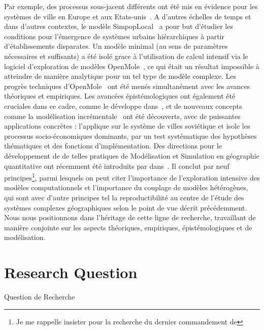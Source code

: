 { Par exemple, des processus sous-jacent différents ont été mis en évidence pour les systèmes de ville en Europe et aux Etats-unis~\cite{bretagnolle2010comparer}. A d'autres échelles de temps et dans d'autres contextes, le modèle SimpopLocal~\cite{schmitt2014modelisation} a pour but d'étudier les conditions pour l'émergence de systèmes urbains hiérarchiques à partir d'établissements disparates. Un modèle minimal (au sens de paramètres nécessaires et suffisants) a été isolé grace à l'utilisation de calcul intensif via le logiciel d'exploration de modèles OpenMole~\cite{schmitt2014half}, ce qui était un résultat impossible à atteindre de manière analytique pour un tel type de modèle complexe. Les progrès techniques d'OpenMole~\cite{reuillon2013openmole} ont été menés simultanément avec les avances théoriques et empiriques. Les avancées épistémologiques ont également été cruciales dans ce cadre, comme  le développe dans~\cite{rey2015plateforme}, et de nouveaux concepts comme la modélisation incrémentale~\cite{cottineau2015incremental} ont été découverts, avec de puissantes applications concrètes : \cite{cottineau2014evolution} l'applique sur le système de villes soviétique et isole les processus socio-économiques dominants, par un test systématique des hypothèses thématiques et des fonctions d'implémentation. Des directions pour le développement de de telles pratiques de Modélisation et Simulation en géographie quantitative ont récemment été introduits par  dans~\cite{banos2013pour}. Il conclut par neuf principes\footnote{Je me rappelle  insister pour la recherche du dernier commandement de }, parmi lesquels on peut citer l'importance de l'exploration intensive des modèles computationnels et l'importance du couplage de modèles hétérogènes, qui sont avec d'autre principes tel la reproductibilité au centre de l'étude des systèmes complexes géographiques selon le point de vue décrit précédemment. Nous nous positionnons dans l'héritage de cette ligne de recherche, travaillant de manière conjointe sur les aspects théoriques, empiriques, épistémologiques et de modélisation.
}



\section*{Research Question}{Question de Recherche}

